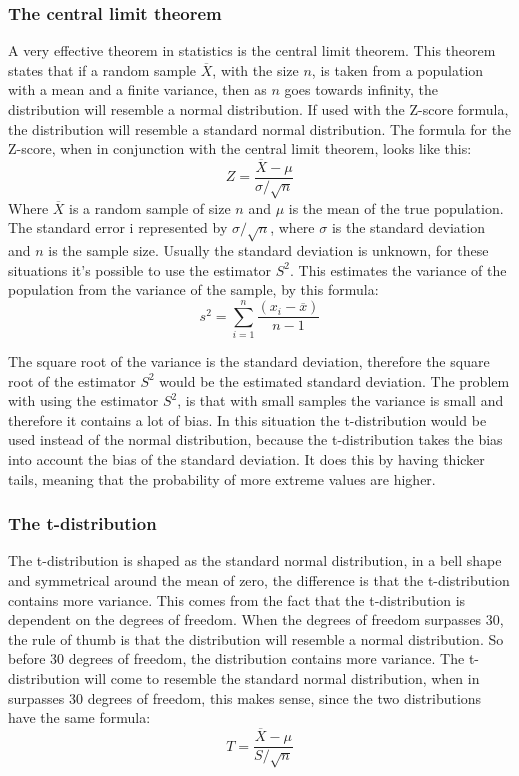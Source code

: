 \subsubsection{The central limit theorem}
A very effective theorem in statistics is the central limit theorem. This theorem states that if a random sample $\overline{X}$, with the size $n$, is taken from a population with a mean and a finite variance, then as $n$ goes towards infinity, the distribution will resemble a normal distribution. If used with the Z-score formula, the distribution will resemble a standard normal distribution. The formula for the Z-score, when in conjunction with the central limit theorem, looks like this:
$$Z=\frac{\overline{X}-\mu}{\sigma/\sqrt{n}}$$
Where $\overline{X}$ is a random sample of size $n$ and $\mu$ is the mean of the true population. The standard error i represented by $\sigma/\sqrt{n}$, where $\sigma$ is the standard deviation and $n$ is the sample size.
Usually the standard deviation is unknown, for these situations it's possible to use the estimator $S^2$. This estimates the variance of the population from the variance of the sample, by this formula:
$$s^2=\sum_{i=1}^{n}\frac{(x_{i}-\overline{x})}{n-1}$$

The square root of the variance is the standard deviation, therefore the square root of the estimator $S^2$ would be the estimated standard deviation. The problem with using the estimator $S^2$, is that with small samples the variance is small and therefore it contains a lot of bias. In this situation the t-distribution would be used instead of the normal distribution, because the t-distribution takes the bias into account the bias of the standard deviation. It does this by having thicker tails, meaning that the probability of more extreme values are higher.

\subsubsection{The t-distribution}
The t-distribution is shaped as the standard normal distribution, in a bell shape and symmetrical around the mean of zero, the difference is that the t-distribution contains more variance. This comes from the fact that the t-distribution is dependent on the degrees of freedom. When the degrees of freedom surpasses 30, the rule of thumb is that the distribution will resemble a normal distribution. So before 30 degrees of freedom, the distribution contains more variance.
The t-distribution will come to resemble the standard normal distribution, when in surpasses 30 degrees of freedom, this makes sense, since the two distributions have the same formula:
$$T=\frac{\overline{X}-\mu}{S/\sqrt{n}}$$

